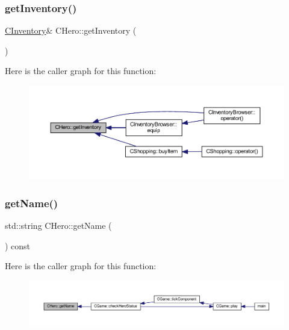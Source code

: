 \subsubsection{\texorpdfstring{get\+Inventory()}{getInventory()}}
{\footnotesize\ttfamily \mbox{\hyperlink{class_c_inventory}{C\+Inventory}}\& C\+Hero\+::get\+Inventory (\begin{DoxyParamCaption}{ }\end{DoxyParamCaption})\hspace{0.3cm}{\ttfamily [inline]}}

Here is the caller graph for this function\+:\nopagebreak
\begin{figure}[H]
\begin{center}
\leavevmode
\includegraphics[width=350pt]{class_c_hero_a2968af0dfd838d16690dc67e652b6f89_icgraph}
\end{center}
\end{figure}
\mbox{\label{class_c_hero_ae4b84144aca1948f65daa0b9734f163f}} 
\subsubsection{\texorpdfstring{get\+Name()}{getName()}}
{\footnotesize\ttfamily std\+::string C\+Hero\+::get\+Name (\begin{DoxyParamCaption}{ }\end{DoxyParamCaption}) const\hspace{0.3cm}{\ttfamily [inline]}}

Here is the caller graph for this function\+:\nopagebreak
\begin{figure}[H]
\begin{center}
\leavevmode
\includegraphics[width=350pt]{class_c_hero_ae4b84144aca1948f65daa0b9734f163f_icgraph}
\end{center}
\end{figure}
\mbox{\label{class_c_hero_acf265a146732ccfe08db87b6cc69cef3}} 
